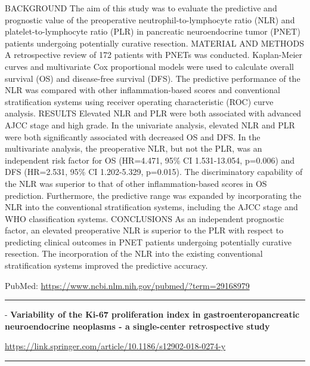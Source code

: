 \documentclass[]{article}
\begin{document}
BACKGROUND The aim of this study was to evaluate the predictive and
prognostic value of the preoperative neutrophil-to-lymphocyte ratio
(NLR) and platelet-to-lymphocyte ratio (PLR) in pancreatic
neuroendocrine tumor (PNET) patients undergoing potentially curative
resection. MATERIAL AND METHODS A retrospective review of 172 patients
with PNETs was conducted. Kaplan-Meier curves and multivariate Cox
proportional models were used to calculate overall survival (OS) and
disease-free survival (DFS). The predictive performance of the NLR was
compared with other inflammation-based scores and conventional
stratification systems using receiver operating characteristic (ROC)
curve analysis. RESULTS Elevated NLR and PLR were both associated with
advanced AJCC stage and high grade. In the univariate analysis, elevated
NLR and PLR were both significantly associated with decreased OS and
DFS. In the multivariate analysis, the preoperative NLR, but not the
PLR, was an independent risk factor for OS (HR=4.471, 95\% CI
1.531-13.054, p=0.006) and DFS (HR=2.531, 95\% CI 1.202-5.329, p=0.015).
The discriminatory capability of the NLR was superior to that of other
inflammation-based scores in OS prediction. Furthermore, the predictive
range was expanded by incorporating the NLR into the conventional
stratification systems, including the AJCC stage and WHO classification
systems. CONCLUSIONS As an independent prognostic factor, an elevated
preoperative NLR is superior to the PLR with respect to predicting
clinical outcomes in PNET patients undergoing potentially curative
resection. The incorporation of the NLR into the existing conventional
stratification systems improved the predictive accuracy.

PubMed: \url{https://www.ncbi.nlm.nih.gov/pubmed/?term=29168979}

{}

{}

\begin{center}\rule{0.5\linewidth}{\linethickness}\end{center}

 - \textbf{Variability of the Ki-67 proliferation index in
gastroenteropancreatic neuroendocrine neoplasms - a single-center
retrospective study}

\url{https://link.springer.com/article/10.1186/s12902-018-0274-y}

\begin{center}\rule{0.5\linewidth}{\linethickness}\end{center}
\end{document}
